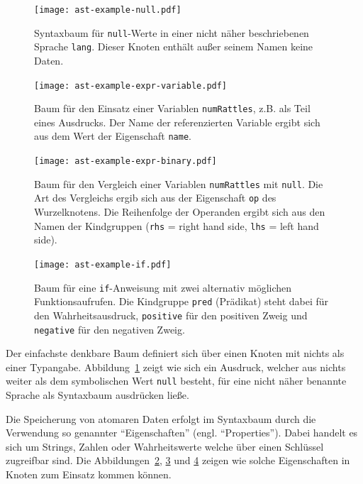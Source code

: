 \documentclass[paper=a4,fontsize=12pt,parskip=half]{scrartcl}
\begin{document}
\begin{figure}[p]
  \centering\texttt{[image: ast-example-null.pdf]}
  \caption{Syntaxbaum für \texttt{null}-Werte in einer nicht näher beschriebenen Sprache \texttt{lang}. Dieser Knoten enthält außer seinem Namen keine Daten.}
  \label{fig:ast-example-null}
\end{figure}

\begin{figure}[p]
  \centering\texttt{[image: ast-example-expr-variable.pdf]}
  \caption{Baum für den Einsatz einer Variablen \texttt{numRattles}, z.B. als Teil eines Ausdrucks. Der Name der referenzierten Variable ergibt sich aus dem Wert der Eigenschaft \texttt{name}.}
  \label{fig:ast-example-variable}
\end{figure}

\begin{figure}[p]
  \centering\texttt{[image: ast-example-expr-binary.pdf]}
  \caption{Baum für den Vergleich einer Variablen \texttt{numRattles} mit \texttt{null}. Die Art des Vergleichs ergib sich aus der Eigenschaft \texttt{op} des Wurzelknotens. Die Reihenfolge der Operanden ergibt sich aus den Namen der Kindgruppen (\texttt{rhs} = right hand side, \texttt{lhs} = left hand side).}
  \label{fig:ast-example-binary}
\end{figure}

\begin{figure}[p]
  \centering\texttt{[image: ast-example-if.pdf]}
  \caption{Baum für eine \texttt{if}-Anweisung mit zwei alternativ möglichen Funktionsaufrufen. Die Kindgruppe \texttt{pred} (Prädikat) steht dabei für den Wahrheitsausdruck, \texttt{positive} für den positiven Zweig und \texttt{negative} für den negativen Zweig.}
  \label{fig:ast-example-if}
\end{figure}

Der einfachste denkbare Baum definiert sich über einen Knoten mit nichts als einer Typangabe. Abbildung~\ref{fig:ast-example-null} zeigt wie sich ein Ausdruck, welcher aus nichts weiter als dem symbolischen Wert \texttt{null} besteht, für eine nicht näher benannte Sprache als Syntaxbaum ausdrücken ließe.

Die Speicherung von atomaren Daten erfolgt im Syntaxbaum durch die Verwendung so genannter \enquote{Eigenschaften} (engl. \enquote{Properties}). Dabei handelt es sich um Strings, Zahlen oder Wahrheitswerte welche über einen Schlüssel zugreifbar sind. Die Abbildungen~\ref{fig:ast-example-variable}, \ref{fig:ast-example-binary} und \ref{fig:ast-example-if} zeigen wie solche Eigenschaften in Knoten zum Einsatz kommen können.
\end{document}
